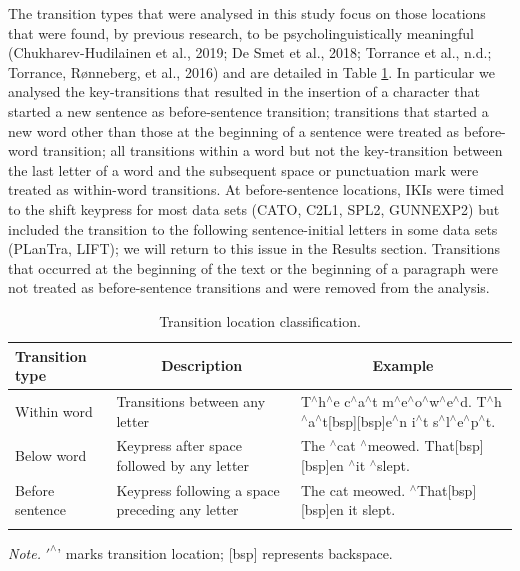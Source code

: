 \documentclass[
  english,
  man,floatsintext]{apa7}
\begin{document}
The transition types that were analysed in this study focus on those locations that were found, by previous research, to be psycholinguistically meaningful (Chukharev-Hudilainen et al., 2019; De Smet et al., 2018; Torrance et al., n.d.; Torrance, Rønneberg, et al., 2016) and are detailed in Table \ref{tab:keyloc}. In particular we analysed the key-transitions that resulted in the insertion of a character that started a new sentence as before-sentence transition; transitions that started a new word other than those at the beginning of a sentence were treated as before-word transition; all transitions within a word but not the key-transition between the last letter of a word and the subsequent space or punctuation mark were treated as within-word transitions. At before-sentence locations, IKIs were timed to the shift keypress for most data sets (CATO, C2L1, SPL2, GUNNEXP2) but included the transition to the following sentence-initial letters in some data sets (PLanTra, LIFT); we will return to this issue in the Results section. Transitions that occurred at the beginning of the text or the beginning of a paragraph were not treated as before-sentence transitions and were removed from the analysis.

\begin{table}[tbp]

\begin{center}
\begin{threeparttable}

\caption{\label{tab:keyloc}Transition location classification.}

\footnotesize{

\begin{tabular}{p{3cm}p{3cm}p{8cm}}
\toprule
Transition type & \multicolumn{1}{c}{Description} & \multicolumn{1}{c}{Example}\\
\midrule
Within word & Transitions between any letter & T$^{\wedge}$h$^{\wedge}$e c$^{\wedge}$a$^{\wedge}$t m$^{\wedge}$e$^{\wedge}$o$^{\wedge}$w$^{\wedge}$e$^{\wedge}$d. T$^{\wedge}$h$^{\wedge}$a$^{\wedge}$t[bsp][bsp]e$^{\wedge}$n i$^{\wedge}$t s$^{\wedge}$l$^{\wedge}$e$^{\wedge}$p$^{\wedge}$t.\\
Below word & Keypress after space followed by any letter & The $^{\wedge}$cat $^{\wedge}$meowed. That[bsp][bsp]en $^{\wedge}$it $^{\wedge}$slept.\\
Before sentence & Keypress following a space preceding any letter & The cat meowed. $^{\wedge}$That[bsp][bsp]en it slept.\\
\bottomrule
\addlinespace
\end{tabular}

}

\begin{tablenotes}[para]
\normalsize{\textit{Note.} $'^{\wedge}$' marks transition location; [bsp] represents backspace.}
\end{tablenotes}

\end{threeparttable}
\end{center}

\end{table}
\end{document}
